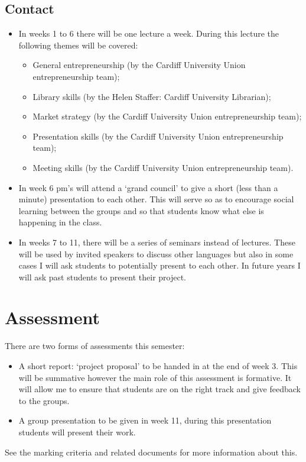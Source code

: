 \documentclass{article}
\begin{document}
    \subsection{Contact}
        \begin{itemize}
            \item In weeks 1 to 6 there will be one lecture a week. During this lecture the following themes will be covered:
                \begin{itemize}
                    \item General entrepreneurship (by the Cardiff University Union entrepreneurship team);
                    \item Library skills (by the Helen Staffer: Cardiff University Librarian);
                    \item Market strategy (by the Cardiff University Union entrepreneurship team);
                    \item Presentation skills (by the Cardiff University Union entrepreneurship team);
                    \item Meeting skills (by the Cardiff University Union entrepreneurship team).
                \end{itemize}
            \item In week 6 pm's will attend a `grand council' to give a short (less than a minute) presentation to each other. This will serve so as to encourage social learning between the groups and so that students know what else is happening in the class.
            \item In weeks 7 to 11, there will be a series of seminars instead of lectures. These will be used by invited speakers to discuss other languages but also in some cases I will ask students to potentially present to each other. In future years I will ask past students to present their project.
        \end{itemize}

\section{Assessment}

There are two forms of assessments this semester:

\begin{itemize}
    \item A short report: `project proposal' to be handed in at the end of week 3. This will be summative however the main role of this assessment is formative. It will allow me to ensure that students are on the right track and give feedback to the groups.
    \item A group presentation to be given in week 11, during this presentation students will present their work.
\end{itemize}

See the marking criteria and related documents for more information about this.
\end{document}
